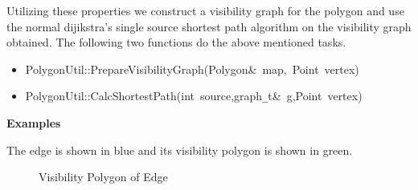 Utilizing these properties we construct a visibility graph for the polygon and use the normal dijikstra's single source shortest path
 algorithm on the visibility graph obtained. The following two functions do the above mentioned tasks.



\begin{itemize}


\item

{
\noindent \ttfamily
\noindent \ttfamily
\noindent \ttfamily
\noindent \ttfamily
\jttstylek PolygonUtil::PrepareVisibilityGraph\jttstylei (\jttstylek Polygon\&~map,~Point~vertex\jttstylei [])\\

}


\item

{
\noindent \ttfamily
\jttstylek PolygonUtil::CalcShortestPath\jttstylei (\jttstylej int~\jttstylek source,graph\verb#_#t\&~g,Point~vertex\jttstylei [])\\
\noindent \ttfamily
}

\end{itemize}

{\bf Examples}

The edge is shown in blue and its visibility polygon is shown in green.

\begin{figure}[h]
\begin{center}
\caption{\label{fig:Visibility Polygon of Edge}Visibility Polygon of Edge}
\end{center}
\end{figure}






